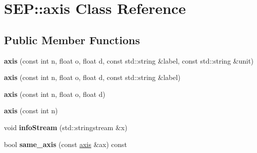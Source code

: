 \hypertarget{class_s_e_p_1_1axis}{}\section{S\+EP\+:\+:axis Class Reference}
\label{class_s_e_p_1_1axis}
\subsection*{Public Member Functions}
\begin{DoxyCompactItemize}
\item 
\mbox{\label{class_s_e_p_1_1axis_a44250ee2a1d8108c7b9471b205557645}} 
{\bfseries axis} (const int n, float o, float d, const std\+::string \&label, const std\+::string \&unit)
\item 
\mbox{\label{class_s_e_p_1_1axis_a947cedb54eeb385a6d5efbf4f9135f6c}} 
{\bfseries axis} (const int n, float o, float d, const std\+::string \&label)
\item 
\mbox{\label{class_s_e_p_1_1axis_ac3d80d36cbf2aeec260f9e63d9f331c9}} 
{\bfseries axis} (const int n, float o, float d)
\item 
\mbox{\label{class_s_e_p_1_1axis_a5508266bb3b3dcc11568e09dbb374cc8}} 
{\bfseries axis} (const int n)
\item 
\mbox{\label{class_s_e_p_1_1axis_ab1f96ad9e3010a1b6d5551e9b81f3d07}} 
void {\bfseries info\+Stream} (std\+::stringstream \&x)
\item 
\mbox{\label{class_s_e_p_1_1axis_affe3094f20c4f32814e23cabaabe4c43}} 
bool {\bfseries same\+\_\+axis} (const \hyperlink{class_s_e_p_1_1axis}{axis} \&ax) const
\end{DoxyCompactItemize}
